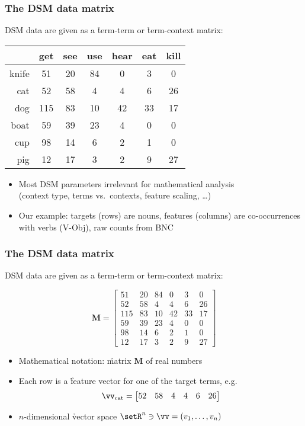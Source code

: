 \begin{frame}
  \frametitle{The DSM data matrix}

  DSM data are given as a \h{term-term} or \h{term-context} matrix:

  \gap[.5]
  \begin{center}\small
  \begin{tabular}{r | cccccc}
          &  get & see & use & hear & eat & kill \\
    \midrule
    knife &  51  & 20  & 84  &   0  &  3  &   0 \\
    cat   &  52  & 58  &  4  &   4  &  6  &  26 \\
    dog   & 115  & 83  & 10  &  42  & 33  &  17 \\
    boat  &  59  & 39  & 23  &   4  &  0  &   0 \\
    cup   &  98  & 14  &  6  &   2  &  1  &   0 \\
    pig   &  12  & 17  &  3  &   2  &  9  &  27
  \end{tabular}
  \end{center}

  \begin{itemize}
  \item Most DSM parameters irrelevant for mathematical analysis\\
    (context type, terms vs.\ contexts, feature scaling, \ldots)
  \item Our example: targets (rows) are nouns, features (columns) are
    co-occurrences with verbs (V-Obj), raw counts from BNC
  \end{itemize}
\end{frame}

\begin{frame}
  \frametitle{The DSM data matrix}

  DSM data are given as a \h{term-term} or \h{term-context} matrix:

  \[
  \mathbf{M} = 
  \begin{bmatrix}
     51  & 20  & 84  &   0  &  3  &   0 \\
     52  & 58  &  4  &   4  &  6  &  26 \\
    115  & 83  & 10  &  42  & 33  &  17 \\
     59  & 39  & 23  &   4  &  0  &   0 \\
     98  & 14  &  6  &   2  &  1  &   0 \\
     12  & 17  &  3  &   2  &  9  &  27
  \end{bmatrix}
  \]
  \begin{itemize}
    \item Mathematical notation: \h{matrix} $\mathbf{M}$ of real numbers
    \item Each row is a \h{feature vector} for one of the target terms, e.g.
      \[
      \vv_{\text{cat}} =
      \begin{bmatrix}
        52  & 58  &  4  &   4  &  6  &  26
      \end{bmatrix}
      \]
    \item $n$-dimensional \h{vector space} $\setR^n \ni \vv = (v_1,\ldots, v_n)$
  \end{itemize}
\end{frame}

